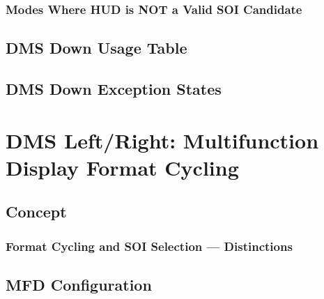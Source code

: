 \documentclass[11pt, a4paper, twoside]{report}
\begin{document}
\subsubsection{Modes Where HUD is NOT a Valid SOI Candidate}

\subsection{DMS Down Usage Table}

\subsection{DMS Down Exception States}

\section{DMS Left/Right: Multifunction Display Format Cycling}


\subsection{Concept}

\subsubsection{Format Cycling and SOI Selection --- Distinctions}

\subsection{MFD Configuration}

\end{document}

